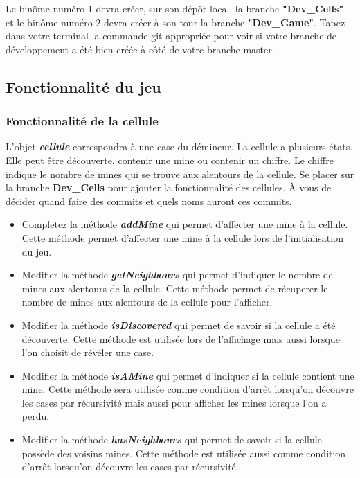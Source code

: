\medskip

\noindent Le binôme numéro 1 devra créer, sur son dépôt local, la branche \textbf{"Dev\_Cells"} et le binôme numéro 2 devra créer à son tour la branche \textbf{"Dev\_Game"}. Tapez dans votre terminal la commande git appropriée pour voir si votre branche de développement a été bien créée à côté de votre branche master.

\subsection{Fonctionnalité du jeu}
\subsubsection{Fonctionnalité de la cellule}
\noindent L'objet \textit{\textbf{cellule}} correspondra à une case du démineur. La cellule a plusieurs états. Elle peut être découverte, contenir une mine ou contenir un chiffre. Le chiffre indique le nombre de mines qui se trouve aux alentours de la cellule. Se placer sur la branche \textbf{Dev\_Cells} pour ajouter la fonctionnalité des cellules. À vous de décider quand faire des commits et quels noms auront ces commits.

\medskip

\begin{itemize}
    \item Completez la méthode \textit{\textbf{addMine}} qui permet d'affecter une mine à la cellule. Cette méthode permet d'affecter une mine à la cellule lors de l'initialisation du jeu.
    \medskip
    \item Modifier la méthode \textit{\textbf{getNeighbours}} qui permet d'indiquer le nombre de mines aux alentours de la cellule. Cette méthode permet de récuperer le nombre de mines aux alentours de la cellule pour l'afficher.
    \medskip
    \item Modifier la méthode \textit{\textbf{isDiscovered}} qui permet de savoir si la cellule a été découverte. Cette méthode est utilisée lors de l'affichage mais aussi lorsque l'on choisit de révéler une case.
    \medskip
    \item Modifier la méthode \textit{\textbf{isAMine}} qui permet d'indiquer si la cellule contient une mine. Cette méthode sera utilisée comme condition d'arrêt lorsqu'on découvre les cases par récursivité mais aussi pour afficher les mines lorsque l'on a perdu.
    \medskip
    \item Modifier la méthode \textit{\textbf{hasNeighbours}} qui permet de savoir si la cellule possède des voisins mines. Cette méthode est utilisée aussi comme condition d'arrêt lorsqu'on découvre les cases par récursivité.
\end{itemize}

